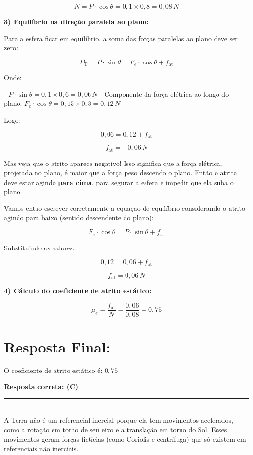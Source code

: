 \documentclass[a4paper,12pt]{article}
\begin{document}
\begin{flushleft}
\[
N = P \cdot \cos\theta = 0{,}1 \times 0{,}8 = 0{,}08\,N
\]

\textbf{3) Equilíbrio na direção paralela ao plano:}

Para a esfera ficar em equilíbrio, a soma das forças paralelas ao plano deve ser zero:

\[
P_{\text{T}} = P \cdot \sin\theta = F_e \cdot \cos\theta + f_{\text{at}}
\]

Onde:

- $P \cdot \sin\theta = 0{,}1 \times 0{,}6 = 0{,}06\,N$
- Componente da força elétrica ao longo do plano: $F_e \cdot \cos\theta = 0{,}15 \times 0{,}8 = 0{,}12\,N$

Logo:

\[
0{,}06 = 0{,}12 + f_{\text{at}}
\]

\[
f_{\text{at}} = -0{,}06\,N
\]

\colorbox{yellow!20}{Mas veja que o atrito aparece negativo!} Isso significa que a força elétrica, projetada no plano, é maior que 
a força peso descendo o plano. Então o atrito deve estar agindo \textbf{para cima}, para segurar a esfera e impedir que ela suba o plano.

Vamos então escrever corretamente a equação de equilíbrio considerando o atrito agindo para baixo (sentido descendente do plano):

\[
\boxed{
F_e \cdot \cos\theta = P \cdot \sin\theta + f_{\text{at}}
}
\]

Substituindo os valores:

\[
0{,}12 = 0{,}06 + f_{\text{at}}
\]

\[
f_{\text{at}} = 0{,}06\,N
\]

\textbf{4) Cálculo do coeficiente de atrito estático:}

\[
\mu_e = \frac{f_{\text{at}}}{N} = \frac{0{,}06}{0{,}08} = 0{,}75
\]

\section*{Resposta Final:}

O coeficiente de atrito estático é: $\boxed{0{,}75}$

\textbf{Resposta correta: \colorbox{green!50}{(C)}}

\end{flushleft}

\noindent\rule{\linewidth}{0.6pt}\\

\colorbox{yellow!30}{A Terra não é um referencial inercial porque ela tem movimentos acelerados}, como a rotação em torno de seu eixo 
e a translação em torno do Sol. Esses movimentos geram \colorbox{yellow!30}{forças fictícias (como Coriolis e centrífuga)} que só existem em referenciais não inerciais.
\end{document}

